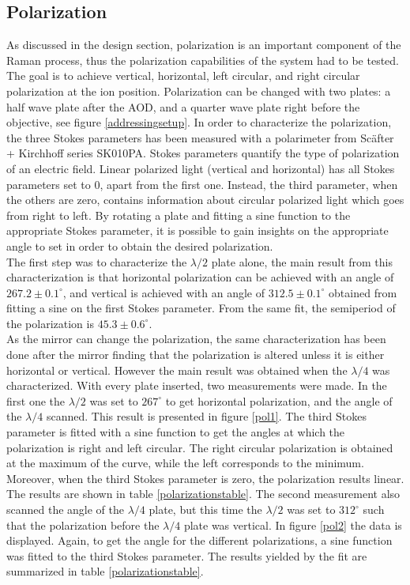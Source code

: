 \subsection{Polarization}
As discussed in the design section, polarization is an important component of the Raman process, thus the polarization capabilities of the system had to be tested. The goal is to achieve vertical, horizontal, left circular, and right circular polarization at the ion position. Polarization can be changed with two plates: a half wave plate after the AOD, and a quarter wave plate right before the objective, see figure \ref{addressingsetup}. In order to characterize the polarization, the three Stokes parameters \cite{stokes} has been measured with a polarimeter from Sc\"after + Kirchhoff series SK010PA. Stokes parameters quantify the type of polarization of an electric field. Linear polarized light (vertical and horizontal) has all Stokes parameters set to 0, apart from the first one. Instead, the third parameter, when the others are zero, contains information about circular polarized light which goes from right to left. By rotating a plate and fitting a sine function to the appropriate Stokes parameter, it is possible to gain insights on the appropriate angle to set in order to obtain the desired polarization.\\
 The first step was to characterize the $\lambda/2$ plate alone, the main result from this characterization is that horizontal polarization can be achieved with an angle of $267.2\pm 0.1 ^{\circ}$, and vertical is achieved with an angle of $312.5\pm0.1^{\circ}$ obtained from fitting a sine on the first Stokes parameter. From the same fit, the semiperiod of the polarization is $45.3\pm 0.6^\circ$.\\
As the mirror can change the polarization, the same characterization has been done after the mirror finding that the polarization is altered unless it is either horizontal or vertical.
However the main result was obtained when the $\lambda/4$ was characterized. With every plate inserted, two measurements were made. In the first one the $\lambda/2$ was set to $267^\circ$ to get horizontal polarization, and the angle of the $\lambda/4$ scanned. This result is presented in figure \ref{pol1}. The third Stokes parameter is fitted with a sine function to get the angles at which the polarization is right and left circular. The right circular polarization is obtained at the maximum of the curve, while the left corresponds to the minimum. Moreover, when the third Stokes parameter is zero, the polarization results linear. The results are shown in table \ref{polarizationstable}.
The second measurement also scanned the angle of the $\lambda/4$ plate, but this time the $\lambda/2$ was set to $312^\circ$ such that the polarization before the $\lambda/4$ plate was vertical. In figure \ref{pol2} the data is displayed. Again, to get the angle for the different polarizations, a sine function was fitted to the third Stokes parameter. The results yielded by the fit are summarized in table \ref{polarizationstable}.


